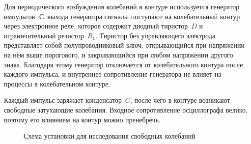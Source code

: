 Для периодического возбуждения колебаний в контуре используется генератор
импульсов. С~выхода генератора сигналы поступают на колебательный контур через
электронное реле, которое содержит диодный тиристор~$D$ и ограничительный
резистор~$R_1$. Тиристор без управляющего электрода представляет собой
полупроводниковый ключ, открывающийся при напряжении на нём выше порогового, и
закрывающийся при любом напряжении другого знака. Благодаря этому генератор
отключается от колебательного контура после каждого импульса, и внутреннее
сопротивление генератора не влияет на процессы в колебательном контуре.

Каждый импульс заряжает конденсатор~$C$, после чего в контуре возникают
свободные затухающие колебания. Входное сопротивление осциллографа велико,
поэтому его влиянием на контур можно пренебречь.

\begin{figure}[h!]
    \centering
	\caption{Схема установки для исследования свободных колебаний}
\end{figure}

